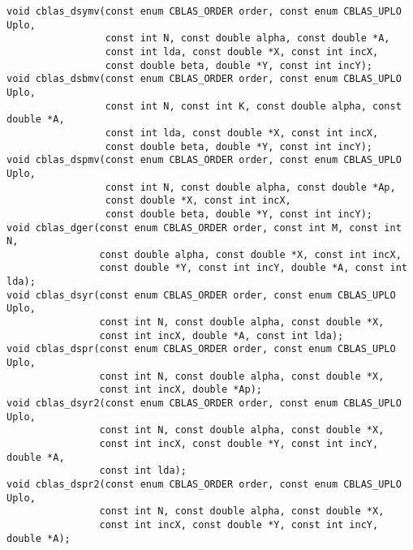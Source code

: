\documentclass{article}
\begin{document}
\begin{Verbatim}[fontsize=\small,fontfamily=tt,fontshape=rm]
void cblas_dsymv(const enum CBLAS_ORDER order, const enum CBLAS_UPLO Uplo,
                 const int N, const double alpha, const double *A,
                 const int lda, const double *X, const int incX,
                 const double beta, double *Y, const int incY);
void cblas_dsbmv(const enum CBLAS_ORDER order, const enum CBLAS_UPLO Uplo,
                 const int N, const int K, const double alpha, const double *A,
                 const int lda, const double *X, const int incX,
                 const double beta, double *Y, const int incY);
void cblas_dspmv(const enum CBLAS_ORDER order, const enum CBLAS_UPLO Uplo,
                 const int N, const double alpha, const double *Ap,
                 const double *X, const int incX,
                 const double beta, double *Y, const int incY);
void cblas_dger(const enum CBLAS_ORDER order, const int M, const int N,
                const double alpha, const double *X, const int incX,
                const double *Y, const int incY, double *A, const int lda);
void cblas_dsyr(const enum CBLAS_ORDER order, const enum CBLAS_UPLO Uplo,
                const int N, const double alpha, const double *X,
                const int incX, double *A, const int lda);
void cblas_dspr(const enum CBLAS_ORDER order, const enum CBLAS_UPLO Uplo,
                const int N, const double alpha, const double *X,
                const int incX, double *Ap);
void cblas_dsyr2(const enum CBLAS_ORDER order, const enum CBLAS_UPLO Uplo,
                const int N, const double alpha, const double *X,
                const int incX, const double *Y, const int incY, double *A,
                const int lda);
void cblas_dspr2(const enum CBLAS_ORDER order, const enum CBLAS_UPLO Uplo,
                const int N, const double alpha, const double *X,
                const int incX, const double *Y, const int incY, double *A);



\end{Verbatim}
\end{document}
